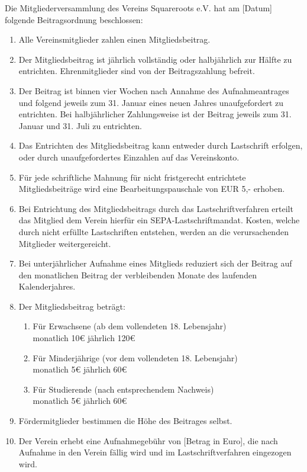 \documentclass[a4paper,ngerman]{scrartcl}
\begin{document}
Die Mitgliederversammlung des Vereins Squareroots e.V. hat am [Datum] folgende Beitragsordnung beschlossen:

\begin{enumerate}
\item Alle Vereinsmitglieder zahlen einen Mitgliedsbeitrag.
\item Der Mitgliedsbeitrag ist jährlich vollständig oder halbjährlich zur Hälfte zu entrichten. Ehrenmitglieder sind von der Beitragszahlung befreit.
\item Der Beitrag ist binnen vier Wochen nach Annahme des Aufnahmeantrages und folgend jeweils zum 31. Januar eines neuen Jahres unaufgefordert zu entrichten. Bei halbjährlicher Zahlungsweise ist der Beitrag jeweils zum 31. Januar und 31. Juli zu entrichten.
\item Das Entrichten des Mitgliedsbeitrag kann entweder durch Lastschrift erfolgen, oder durch unaufgefordertes Einzahlen auf das Vereinskonto.
\item Für jede schriftliche Mahnung für nicht fristgerecht entrichtete Mitgliedsbeiträge wird eine Bearbeitungspauschale von EUR 5,- erhoben.
\item Bei Entrichtung des Mitgliedsbeitrags durch das Lastschriftverfahren erteilt das Mitglied dem Verein hierfür ein SEPA-Lastschriftmandat. Kosten, welche durch nicht erfüllte Lastschriften entstehen, werden an die verursachenden Mitglieder weitergereicht.
\item Bei unterjährlicher Aufnahme eines Mitglieds reduziert sich der Beitrag auf den monatlichen Beitrag der verbleibenden Monate des laufenden Kalenderjahres.
\item Der Mitgliedsbeitrag beträgt:
\begin{enumerate}
\item Für Erwachsene (ab dem vollendeten 18. Lebensjahr)\\
monatlich 10€          jährlich 120€
\item Für Minderjährige (vor dem vollendeten 18. Lebensjahr)\\
monatlich 5€            jährlich 60€
\item Für Studierende (nach entsprechendem Nachweis)\\
monatlich 5€            jährlich 60€
\end{enumerate}
\item Fördermitglieder bestimmen die Höhe des Beitrages selbst.
\item Der Verein erhebt eine Aufnahmegebühr von [Betrag in Euro], die nach Aufnahme in den Verein fällig wird und im Lastschriftverfahren eingezogen wird.

\end{enumerate}
\end{document}
